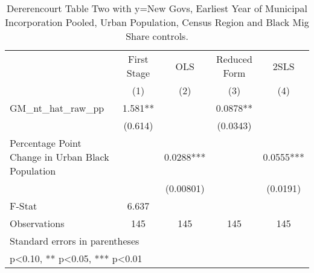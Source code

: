 \begin{table}[htbp]\centering
\def\sym#1{\ifmmode^{#1}\else\(^{#1}\)\fi}
\caption{Dererencourt Table Two with y=New Govs, Earliest Year of Municipal Incorporation Pooled, Urban Population, Census Region and Black Mig Share controls.}
\begin{tabular}{l*{4}{c}}
\toprule
                    & First Stage   &         OLS   &Reduced Form   &        2SLS   \\
                    &\multicolumn{1}{c}{(1)}   &\multicolumn{1}{c}{(2)}   &\multicolumn{1}{c}{(3)}   &\multicolumn{1}{c}{(4)}   \\
\midrule
GM\_nt\_hat\_raw\_pp    &       1.581** &               &      0.0878** &               \\
                    &     (0.614)   &               &    (0.0343)   &               \\
\addlinespace
Percentage Point Change in Urban Black Population&               &      0.0288***&               &      0.0555***\\
                    &               &   (0.00801)   &               &    (0.0191)   \\
\midrule
F-Stat              &       6.637   &               &               &               \\
Observations        &         145   &         145   &         145   &         145   \\
\bottomrule
\multicolumn{5}{l}{\footnotesize Standard errors in parentheses}\\
\multicolumn{5}{l}{\footnotesize * p<0.10, ** p<0.05, *** p<0.01}\\
\end{tabular}
\end{table}
